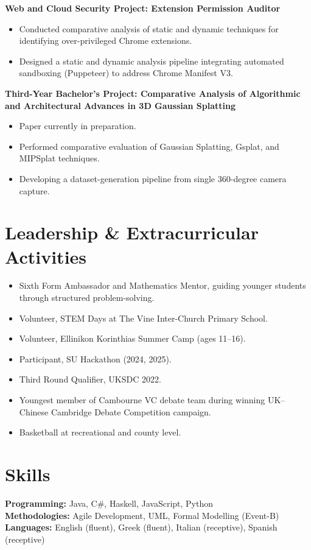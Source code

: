 \documentclass[11pt,a4paper]{article}
\begin{document}
\textbf{Web and Cloud Security Project: Extension Permission Auditor}
\begin{itemize}
    \item Conducted comparative analysis of static and dynamic techniques for identifying over-privileged Chrome extensions.
    \item Designed a static and dynamic analysis pipeline integrating automated sandboxing (Puppeteer) to address Chrome Manifest V3.
\end{itemize}

\textbf{Third-Year Bachelor's Project: Comparative Analysis of Algorithmic and Architectural Advances in 3D Gaussian Splatting}
\begin{itemize}
    \item Paper currently in preparation.
    \item Performed comparative evaluation of Gaussian Splatting, Gsplat, and MIPSplat techniques.
    \item Developing a dataset-generation pipeline from single 360-degree camera capture.
\end{itemize}

\section{Leadership \& Extracurricular Activities}

\begin{itemize}
    \item Sixth Form Ambassador and Mathematics Mentor, guiding younger students through structured problem-solving.
    \item Volunteer, STEM Days at The Vine Inter-Church Primary School.
    \item Volunteer, Ellinikon Korinthias Summer Camp (ages 11--16).
    \item Participant, SU Hackathon (2024, 2025).
    \item Third Round Qualifier, UKSDC 2022.
    \item Youngest member of Cambourne VC debate team during winning UK–Chinese Cambridge Debate Competition campaign.
    \item Basketball at recreational and county level.
\end{itemize}

\section{Skills}

\textbf{Programming:} Java, C\#, Haskell, JavaScript, Python\\
\textbf{Methodologies:} Agile Development, UML, Formal Modelling (Event-B)\\
\textbf{Languages:} English (fluent), Greek (fluent), Italian (receptive), Spanish (receptive)
\end{document}
